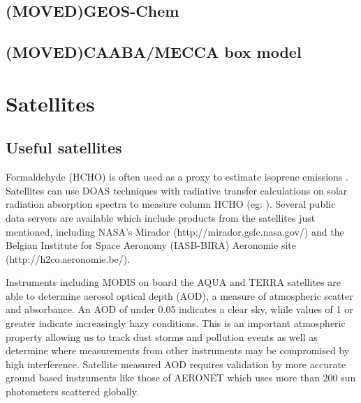   \subsection{(MOVED)GEOS-Chem}
    \label{Ch_LitRev:sec:GEOSChem}
  \subsection{(MOVED)CAABA/MECCA box model}
    \label{ch_LitRev:sec:CAABAMECCAIntro}
\section{Satellites}
\label{ch_LitRev:sec:satellites}


  \subsection{Useful satellites}
    
    
    Formaldehyde (HCHO) is often used as a proxy to estimate isoprene emissions \citep{Marais2012,bauwens2013satellite}.
    Satellites can use DOAS techniques with radiative transfer calculations on solar radiation absorption spectra to measure column HCHO (eg: \citet{Leue2001}).
    Several public data servers are available which include products from the satellites just mentioned, including NASA's Mirador (http://mirador.gsfc.nasa.gov/) and the Belgian Institute for Space Aeronomy (IASB-BIRA) Aeronomie site (http://h2co.aeronomie.be/).

    Instruments including MODIS on board the AQUA and TERRA satellites are able to determine aerosol optical depth (AOD), a measure of atmospheric scatter and absorbance. 
    An AOD of under 0.05 indicates a clear sky, while values of 1 or greater indicate increasingly hazy conditions.
    This is an important atmospheric property allowing us to track dust storms and pollution events as well as determine where measurements from other instruments may be compromised by high interference.
    Satellite measured AOD requires validation by more accurate ground based instruments like those of AERONET which uses more than 200 sun photometers scattered globally. 
  
